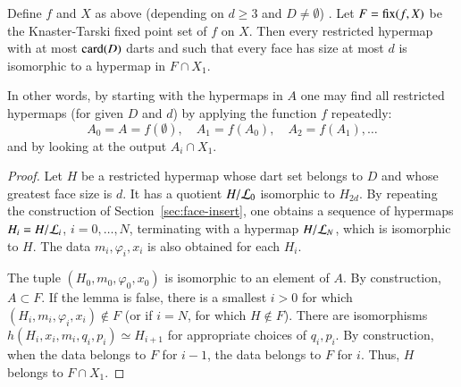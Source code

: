 \begin{lemma}  
Define $f $ and $X$ as above (depending on $d\ge 3$ and $D\ne
\emptyset$) .  Let $F={\operatorname{fix}}(f,X)$ be the Knaster-Tarski fixed
point set of $f$ on $X$.  Then every restricted hypermap with at
most ${\operatorname{card}}(D)$ darts and such that every face has size at most $d$
is isomorphic to a hypermap in $F\cap X_1$.
\end{lemma}
%

In other words, by starting with the  hypermaps in $A$
one may find all restricted hypermaps (for given $D$ and $d$) by
applying the function $f$ repeatedly:
\begin{displaymath}
A_0 = A = f(\emptyset),\quad A_1 = f(A_0),\quad A_2 = f(A_1),\ldots
\end{displaymath}
and by looking at the output $A_i \cap X_1$.
%

\begin{proof} Let $H$ be a restricted hypermap whose dart set belongs
to $D$ and whose greatest face size is $d$.  It has a quotient
$H/{\cal L}_0$ isomorphic to $H_{2d}$.  By repeating the
construction of Section~\ref{sec:face-insert}, one obtains a
sequence of hypermaps $H_i = H/{\cal L}_i$, $i=0,\ldots,N$,
terminating with a hypermap $H/{\cal L}_N$, which is isomorphic to
$H$.  The data $m_i,\varphi_i,x_i$ is also obtained for each $H_i$.

The tuple $(H_0,m_0,\varphi_0,x_0)$ is isomorphic to an element of
$A$.  By construction, $A\subset F$.  If the lemma is false, there
is a smallest $i>0$ for which $(H_i,m_i,\varphi_i,x_i)\not\in F$ (or
if $i=N$, for which $H\not\in F$).  There are isomorphisms
$h(H_i,x_i,m_i,q_i,p_i) \simeq H_{i+1}$ for appropriate choices of
$q_i,p_i$.  By construction, when the data belongs to $F$ for $i-1$,
the data belongs to $F$ for $i$.  Thus, $H$ belongs to $F\cap X_1$.
\end{proof}

